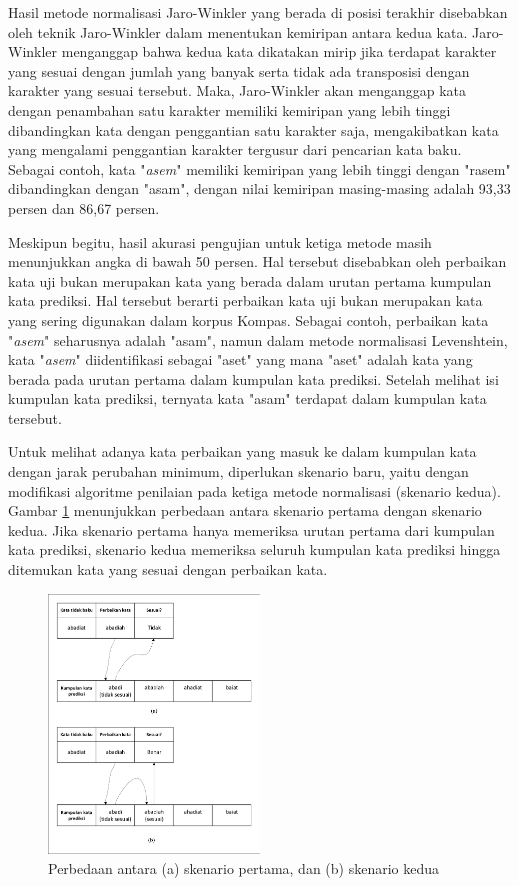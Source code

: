 Hasil metode normalisasi Jaro-Winkler yang berada di posisi terakhir disebabkan oleh teknik Jaro-Winkler dalam menentukan kemiripan antara kedua kata. Jaro-Winkler menganggap bahwa kedua kata dikatakan mirip jika terdapat karakter yang sesuai dengan jumlah yang banyak serta tidak ada transposisi dengan karakter yang sesuai tersebut. Maka, Jaro-Winkler akan menganggap kata dengan penambahan satu karakter memiliki kemiripan yang lebih tinggi dibandingkan kata dengan penggantian satu karakter saja, mengakibatkan kata yang mengalami penggantian karakter tergusur dari pencarian kata baku. Sebagai contoh, kata "\textit{asem}" memiliki kemiripan yang lebih tinggi dengan "rasem" dibandingkan dengan "asam", dengan nilai kemiripan masing-masing adalah 93,33 persen dan 86,67 persen.

Meskipun begitu, hasil akurasi pengujian untuk ketiga metode masih menunjukkan angka di bawah 50 persen. Hal tersebut disebabkan oleh perbaikan kata uji bukan merupakan kata yang berada dalam urutan pertama kumpulan kata prediksi. Hal tersebut berarti perbaikan kata uji bukan merupakan kata yang sering digunakan dalam korpus Kompas. Sebagai contoh, perbaikan kata "\textit{asem}" seharusnya adalah "asam", namun dalam metode normalisasi Levenshtein, kata "\textit{asem}" diidentifikasi sebagai "aset" yang mana "aset" adalah kata yang berada pada urutan pertama dalam kumpulan kata prediksi. Setelah melihat isi kumpulan kata prediksi, ternyata kata "asam" terdapat dalam kumpulan kata tersebut.

Untuk melihat adanya kata perbaikan yang masuk ke dalam kumpulan kata dengan jarak perubahan minimum, diperlukan skenario baru, yaitu dengan modifikasi algoritme penilaian pada ketiga metode normalisasi (skenario kedua). Gambar \ref{fig:skenario_side_to_side} menunjukkan perbedaan antara skenario pertama dengan skenario kedua. Jika skenario pertama hanya memeriksa urutan pertama dari kumpulan kata prediksi, skenario kedua memeriksa seluruh kumpulan kata prediksi hingga ditemukan kata yang sesuai dengan perbaikan kata.
\begin{figure}[ht]
	\centering
	\includegraphics[width=0.5\textwidth, trim=2 2 2 2, clip]{resources/4/skenario_side_to_side.pdf}
	\caption{Perbedaan antara (a) skenario pertama, dan (b) skenario kedua}
	\label{fig:skenario_side_to_side}
\end{figure}

